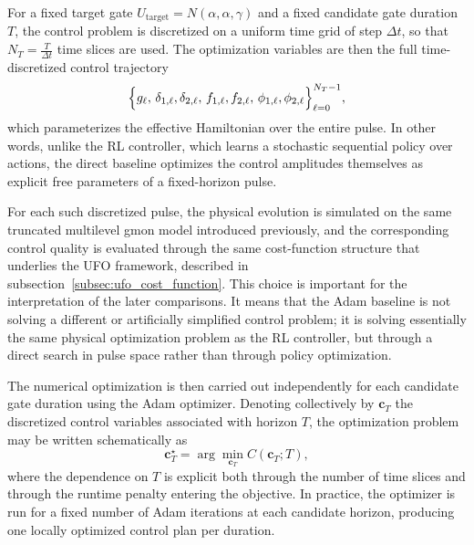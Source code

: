 For a fixed target gate \(U_{\mathrm{target}} = N(\alpha,\alpha,\gamma)\) and a fixed candidate gate duration \(T\), the control problem is discretized on a uniform time grid of step \(\Delta t\), so that
\(
N_T = \frac{T}{\Delta t}
\)
time slices are used. The optimization variables are then the full time-discretized control trajectory
\begin{equation}
\Bigl\{
g_\ell,\,
\delta_{1,\ell},\delta_{2,\ell},\,
f_{1,\ell},f_{2,\ell},\,
\phi_{1,\ell},\phi_{2,\ell}
\Bigr\}_{\ell=0}^{N_T-1},
\label{eq:adam_discretized_controls}
\end{equation}
which parameterizes the effective Hamiltonian over the entire pulse. In other words, unlike the RL controller, which learns a stochastic sequential policy over actions, the direct baseline optimizes the control amplitudes themselves as explicit free parameters of a fixed-horizon pulse.

For each such discretized pulse, the physical evolution is simulated on the same truncated multilevel gmon model introduced previously, and the corresponding control quality is evaluated through the same cost-function structure that underlies the UFO framework, described in subsection~\ref{subsec:ufo_cost_function}.  This choice is important for the interpretation of the later comparisons. It means that the Adam baseline is not solving a different or artificially simplified control problem; it is solving essentially the same physical optimization problem as the RL controller, but through a direct search in pulse space rather than through policy optimization.

The numerical optimization is then carried out independently for each candidate gate duration using the Adam optimizer. Denoting collectively by \(\bm{c}_T\) the discretized control variables associated with horizon \(T\), the optimization problem may be written schematically as
\begin{equation}
\bm{c}_T^{\star}
=
\arg\min_{\bm{c}_T}
C(\bm{c}_T;T),
\label{eq:adam_fixed_horizon_problem}
\end{equation}
where the dependence on \(T\) is explicit both through the number of time slices and through the runtime penalty entering the objective. In practice, the optimizer is run for a fixed number of Adam iterations at each candidate horizon, producing one locally optimized control plan per duration.

